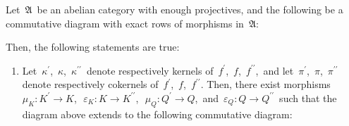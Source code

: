 \begin{theorem}
\mbox{}
\vskip 0.15cm
\noindent
Let \,$\mathfrak{A}$\, be an abelian category with enough projectives, and
the following be a commutative diagram with exact rows of morphisms in \,$\mathfrak{A}$:
\begin{center}
\end{center}
Then, the following statements are true:
\begin{enumerate}
\item
	Let
	\,$\kappa^{\prime}$,\, $\kappa$,\, $\kappa^{\prime\prime}$\, 
	denote respectively kernels of
	\,$f^{\prime}$,\, $f$,\, $f^{\prime\prime}$,\,
	and let
	\,$\pi^{\prime}$,\, $\pi$,\, $\pi^{\prime\prime}$\, 
	denote  respectively cokernels of 
	\,$f^{\prime}$,\, $f$,\, $f^{\prime\prime}$.
	Then, there exist morphisms
	\,$\mu_{K} : K^{\prime} \longrightarrow K$,\,
	\,$\varepsilon_{K} : K \longrightarrow K^{\prime\prime}$,\,
	\,$\mu_{Q} : Q^{\prime} \longrightarrow Q$,\,
	and
	\,$\varepsilon_{Q} : Q \longrightarrow Q^{\prime\prime}$\,
	such that the diagram above extends to the following commutative diagram:
	\begin{center}
\end{center}
\end{enumerate}
\end{theorem}
